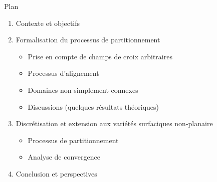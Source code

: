 \documentclass[compress,10pt,aspectratio=169]{beamer}
\begin{document}
\begin{frame}{Plan}
    \vspace{-0.4cm}
    \begin{enumerate}
        \item \color{onera} Contexte et objectifs \\\vspace{0.26cm}
        \item Formalisation du processus de partitionnement %
        \vspace{0.26cm}
        \begin{itemize}
            \item Prise en compte de champs de croix arbitraires\\\vspace{0.18cm}
            \item Processus d'alignement\\\vspace{0.18cm}
            \item Domaines non-simplement connexes\\\vspace{0.18cm}
            \item Discussions (quelques résultats théoriques)\\\vspace{0.18cm}
        \end{itemize}
        \item Discrétisation et extension aux variétés surfaciques non-planaire %
        \vspace{0.26cm}
        \begin{itemize}
            \item Processus de partitionnement\\\vspace{0.18cm}
            \item Analyse de convergence\\\vspace{0.18cm}
        \end{itemize}
        \item Conclusion et perspectives
    \end{enumerate}
\end{frame}
\end{document}
